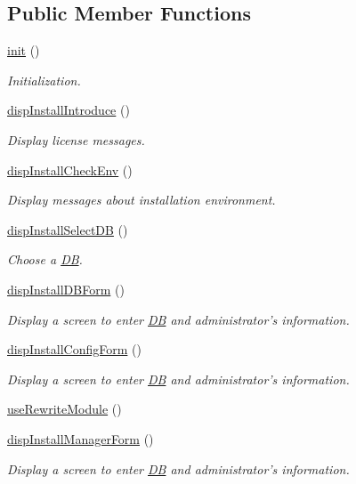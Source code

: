 \subsection*{Public Member Functions}
\begin{DoxyCompactItemize}
\item 
\hyperlink{classinstallView_ab24b18fa10e0268846ac0002d77ee453}{init} ()
\begin{DoxyCompactList}\small\item\em Initialization. \end{DoxyCompactList}\item 
\hyperlink{classinstallView_a811e5c499d36055efb16411c0f0946c1}{disp\+Install\+Introduce} ()
\begin{DoxyCompactList}\small\item\em Display license messages. \end{DoxyCompactList}\item 
\hyperlink{classinstallView_ac73107933a9a9498aaef04380137794d}{disp\+Install\+Check\+Env} ()
\begin{DoxyCompactList}\small\item\em Display messages about installation environment. \end{DoxyCompactList}\item 
\hyperlink{classinstallView_aa3ee9747353f128111f628a5c9359c5f}{disp\+Install\+Select\+D\+B} ()
\begin{DoxyCompactList}\small\item\em Choose a \hyperlink{classDB}{D\+B}. \end{DoxyCompactList}\item 
\hyperlink{classinstallView_a61a05991e6aa8bf2278b9c438b70c8c7}{disp\+Install\+D\+B\+Form} ()
\begin{DoxyCompactList}\small\item\em Display a screen to enter \hyperlink{classDB}{D\+B} and administrator's information. \end{DoxyCompactList}\item 
\hyperlink{classinstallView_ad61c851960b71aad3b93cfd1a23149fb}{disp\+Install\+Config\+Form} ()
\begin{DoxyCompactList}\small\item\em Display a screen to enter \hyperlink{classDB}{D\+B} and administrator's information. \end{DoxyCompactList}\item 
\hyperlink{classinstallView_a276997dd4c77a1a1cec5ceed56367ee9}{use\+Rewrite\+Module} ()
\item 
\hyperlink{classinstallView_a00758f2134453587a409e8e8f3e4fada}{disp\+Install\+Manager\+Form} ()
\begin{DoxyCompactList}\small\item\em Display a screen to enter \hyperlink{classDB}{D\+B} and administrator's information. \end{DoxyCompactList}\end{DoxyCompactItemize}
